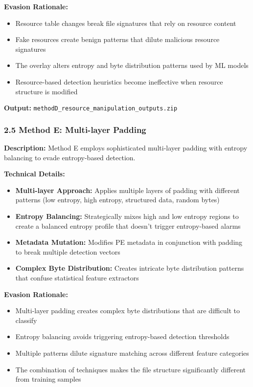 \documentclass[12pt,letterpaper]{article}
\begin{document}
\textbf{Evasion Rationale:}
\begin{itemize}
    \item Resource table changes break file signatures that rely on resource content
    \item Fake resources create benign patterns that dilute malicious resource signatures
    \item The overlay alters entropy and byte distribution patterns used by ML models
    \item Resource-based detection heuristics become ineffective when resource structure is modified
\end{itemize}

\textbf{Output:} \texttt{methodD\_resource\_manipulation\_outputs.zip}

\subsubsection*{2.5 Method E: Multi-layer Padding}

\textbf{Description:} Method E employs sophisticated multi-layer padding with entropy balancing to evade entropy-based detection.

\textbf{Technical Details:}
\begin{itemize}
    \item \textbf{Multi-layer Approach:} Applies multiple layers of padding with different patterns (low entropy, high entropy, structured data, random bytes)
    \item \textbf{Entropy Balancing:} Strategically mixes high and low entropy regions to create a balanced entropy profile that doesn't trigger entropy-based alarms
    \item \textbf{Metadata Mutation:} Modifies PE metadata in conjunction with padding to break multiple detection vectors
    \item \textbf{Complex Byte Distribution:} Creates intricate byte distribution patterns that confuse statistical feature extractors
\end{itemize}

\textbf{Evasion Rationale:}
\begin{itemize}
    \item Multi-layer padding creates complex byte distributions that are difficult to classify
    \item Entropy balancing avoids triggering entropy-based detection thresholds
    \item Multiple patterns dilute signature matching across different feature categories
    \item The combination of techniques makes the file structure significantly different from training samples
\end{itemize}
\end{document}
